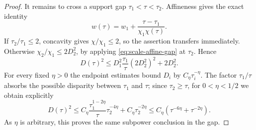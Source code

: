 \documentclass[11pt,a4paper]{article}
\numberwithin{equation}{section}
\theoremstyle{definition}
\theoremstyle{remark}
\begin{document}
\begin{proof}
It remains to cross a support gap $\tau_1<\tau<\tau_2$.
Affineness gives the exact identity
\begin{equation}\label{eq:scale-affine-gap}
 w(\tau)=w_1+\frac{\tau-\tau_1}{\chi_1\chi(\tau)}.
\end{equation}
If $\tau_2/\tau_1\le2$, concavity gives $\chi/\chi_1\le2$,
so the assertion transfers immediately. Otherwise
$\chi_2/\chi_1\le2D_2^2$, by applying
\eqref{eq:scale-affine-gap} at $\tau_2$. Hence
\[
 D(\tau)^2\le
 D_1^2\frac{\tau_1}{\tau}(2D_2^2)^2+2D_2^2.
\]
For every fixed $\eta>0$ the endpoint estimates bound $D_i$ by
$C_\eta\tau_i^{-\eta}$. The factor $\tau_1/\tau$ absorbs the
possible disparity between $\tau_1$ and $\tau$; since
$\tau_2\ge\tau$, for $0<\eta<1/2$ we obtain explicitly
\[
 D(\tau)^2\le
 C_\eta\frac{\tau_1^{1-2\eta}}{\tau}\tau_2^{-4\eta}
       +C_\eta\tau_2^{-2\eta}
 \le C_\eta(\tau^{-6\eta}+\tau^{-2\eta}).
\]
As $\eta$ is arbitrary, this proves the same subpower conclusion in
the gap.
\end{proof}
\end{document}
